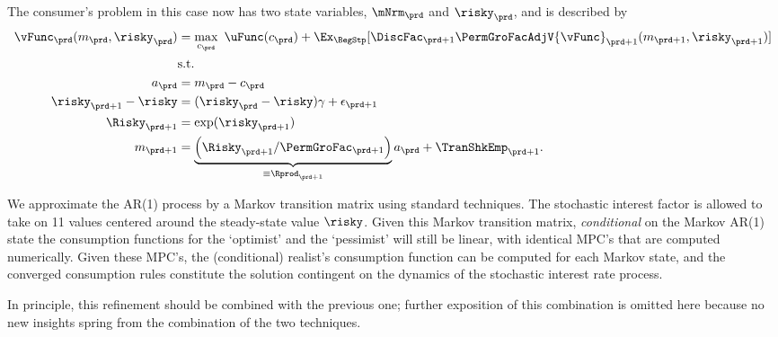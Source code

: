 The consumer's problem in this case now has two state variables, $\mNrm_{\prd}$ and $\risky_{\prd}$, and
is described by
\begin{equation}\begin{gathered}\begin{aligned}
      \vFunc_{\prd}(m_{\prd},\risky_{\prd})  & = \max_{{c}_{\prd}} ~ \uFunc(c_{\prd})+
      \Ex_{\BegStp}[{\DiscFac}_{\prd+1}\PermGroFacAdjV{\vFunc}_{\prd+1}(m_{\prd+1},\risky_{\prd+1})] \label{vNormedRisky}
      \\         & \text{s.t.}   \nonumber \\
      a_{\prd}    & = m_{\prd}-c_{\prd} \nonumber
      \\      \risky_{\prd+1}-\risky  & = (\risky_{\prd}-\risky)\gamma + \epsilon_{\prd+1} \notag
      \\      \Risky_{\prd+1}  & = \exp(\risky_{\prd+1}) \notag
      \\      m_{\prd+1}  & = \underbrace{\left(\Risky_{\prd+1}/\PermGroFac_{\prd+1}\right)}_{\equiv \Rprod_{\prd+1}}a_{\prd}+\TranShkEmp_{\prd+1} \nonumber.
    \end{aligned}\end{gathered}\end{equation}


We approximate the AR(1) process by a Markov transition matrix using standard techniques.  The stochastic interest factor is allowed to take
on 11 values centered around the steady-state value $\risky$.  Given this Markov transition matrix, \textit{conditional} on the Markov AR(1) state the consumption functions for the `optimist' and the `pessimist' will still be linear,
with identical MPC's that are computed numerically.  Given these MPC's, the (conditional) realist's consumption function can be computed for each Markov state, and the converged consumption rules constitute the solution contingent on the dynamics of the stochastic
interest rate process.

In principle, this refinement should be combined with the previous one;
further exposition of this combination is omitted here because no new
insights spring from the combination of the two techniques.



\hypertarget{imposing-artificial-borrowing-constraints}{}
